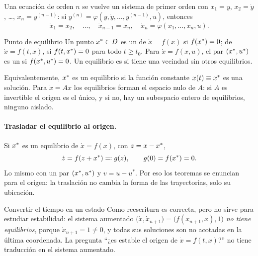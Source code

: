 Una ecuación de orden $n$ se vuelve un sistema de primer orden con $x_1=y$, $x_2=\dot y$, \dots, $x_n=y^{(n-1)}$: si $y^{(n)}=\varphi(y,\dot y,\dots,y^{(n-1)},u)$, entonces
\[
  \dot x_1=x_2,\quad\dots,\quad\dot x_{n-1}=x_n,\quad\dot x_n=\varphi(x_1,\dots,x_n,u).
\]

\begin{definicion}[label=def:in-equilibrio]{Punto de equilibrio}
Un punto $x^{*}\in D$ es un  de $\dot x=f(x)$ si $f(x^{*})=0$; de $\dot x=f(t,x)$, si $f(t,x^{*})=0$ para todo $t\ge t_0$. Para $\dot x=f(x,u)$, el par $(x^{*},u^*)$ es un  si $f(x^{*},u^*)=0$. Un equilibrio es  si tiene una vecindad sin otros equilibrios.
\end{definicion}

Equivalentemente, $x^{*}$ es un equilibrio si la función constante $x(t)\equiv x^{*}$ es una solución. Para $\dot x=Ax$ los equilibrios forman el espacio nulo de $A$: si $A$ es invertible el origen es el único, y si no, hay un subespacio entero de equilibrios, ninguno aislado. 

\paragraph{Trasladar el equilibrio al origen.} Si $x^{*}$ es un equilibrio de $\dot x=f(x)$, con $z=x-x^{*}$,
\[
  \dot z=f(z+x^{*})\eqqcolon g(z),\qquad g(0)=f(x^{*})=0 .
\]
Lo mismo con un par $(x^{*},u^*)$ y $v=u-u^*$. Por eso los teoremas se enuncian para el origen: la traslación no cambia la forma de las trayectorias, solo su ubicación.

\begin{trampa}[label=tr:in-tiempo]{Convertir el tiempo en un estado}
Como reescritura es correcta, pero no sirve para estudiar estabilidad: el sistema aumentado $\bigl(\dot x,\dot x_{n+1}\bigr)=\bigl(f(x_{n+1},x),1\bigr)$ \emph{no tiene equilibrios}, porque $\dot x_{n+1}=1\neq0$, y todas sus soluciones son no acotadas en la última coordenada. La pregunta ``¿es estable el origen de $\dot x=f(t,x)$?'' no tiene traducción en el sistema aumentado.
\end{trampa}

